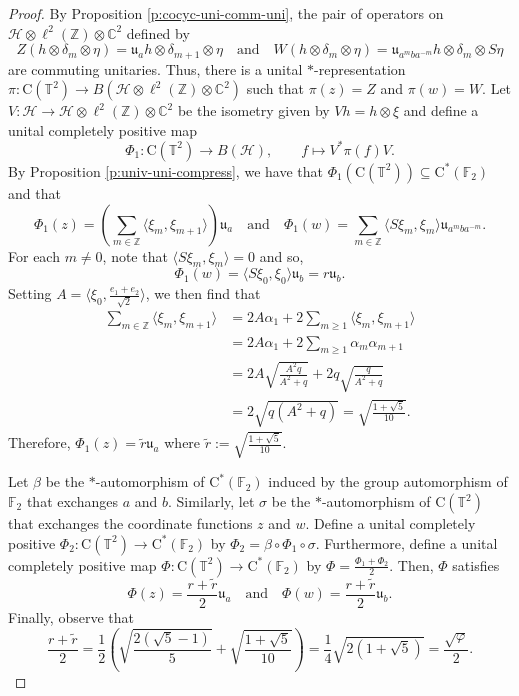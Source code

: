 \documentclass[10pt]{amsart}
\newcommand{\bC}{{\mathbb{C}}}
\newcommand{\bF}{{\mathbb{F}}}
\newcommand{\bT}{{\mathbb{T}}}
\newcommand{\bZ}{{\mathbb{Z}}}
\renewcommand{\H}{{\mathcal{H}}}
\newcommand{\rC}{\mathrm{C}}
\renewcommand{\phi}{\varphi}
\begin{document}
\begin{proof}
    By Proposition \ref{p:cocyc-uni-comm-uni}, the pair of operators on $\H\otimes\ell^2(\bZ)\otimes\bC^2$ defined by
    \[
        Z(h\otimes\delta_m\otimes\eta) = \mathfrak{u}_ah\otimes\delta_{m+1}\otimes\eta \quad \text{and} \quad W(h\otimes\delta_m\otimes\eta) = \mathfrak{u}_{a^mba^{-m}}h\otimes\delta_m\otimes S\eta
    \]
    are commuting unitaries. Thus, there is a unital $*$-representation $\pi:\rC(\bT^2)\rightarrow B(\H\otimes\ell^2(\bZ)\otimes\bC^2)$ such that $\pi(z) = Z$ and $\pi(w) = W$. Let $V:\H\rightarrow\H\otimes\ell^2(\bZ)\otimes\bC^2$ be the isometry given by $Vh = h\otimes\xi$ and define a unital completely positive map
    \[
        \Phi_1:\rC(\bT^2)\longrightarrow B(\H), \qquad f\longmapsto V^*\pi(f)V.
    \]
    By Proposition \ref{p:univ-uni-compress}, we have that $\Phi_1(\rC(\bT^2))\subseteq\rC^*(\bF_2)$ and that
    \[
        \Phi_1(z) = \left( \sum_{m\in\mathbb Z} \langle \xi_m,\xi_{m+1}\rangle\right)\mathfrak{u}_a \quad \text{and} \quad \Phi_1(w) = \sum_{m\in\mathbb Z}\langle S\xi_m,\xi_m\rangle\mathfrak{u}_{a^m b a^{-m}}.
    \]
    For each $m\neq 0$, note that $\langle S\xi_m,\xi_m\rangle = 0$ and so,
    \[
        \Phi_1(w)= \langle S\xi_0,\xi_0\rangle\mathfrak{u}_b =r\mathfrak{u}_b.
    \]
    Setting $A = \langle \xi_0,\frac{e_1+e_2}{\sqrt{2}}\rangle$, we then find that
    \begin{align*}
        \sum_{m\in\bZ}\langle\xi_m, \xi_{m+1}\rangle & =2A\alpha_1  +  2\sum_{m\geq 1}\langle \xi_m, \xi_{m+1}\rangle\\
        & = 2A\alpha_1 + 2 \sum_{m\geq 1}\alpha_m \alpha_{m+1}\\
        & = 2A\sqrt{\frac{A^2q}{A^2+q}} +2q \sqrt{\frac{q}{A^2+q}}\\
        & = 2\sqrt{q\left(A^2 + q \right)} = \sqrt{\frac{1+\sqrt{5}}{10}}.
    \end{align*}
    Therefore, $\Phi_1(z)=\widetilde{r} \mathfrak{u}_a$ where $\widetilde{r}:=\sqrt{\frac{1+\sqrt{5}}{10}}$.
    
    Let $\beta$ be the $*$-automorphism of $\rC^*(\bF_2)$ induced by the group automorphism of $\bF_2$ that exchanges $a$ and $b$. Similarly, let $\sigma$ be the $*$-automorphism of $\rC(\bT^2)$ that exchanges the coordinate functions $z$ and $w$. Define a unital completely positive $\Phi_2:\rC(\bT^2)\rightarrow\rC^*(\bF_2)$ by $\Phi_2 =\beta\circ \Phi_1\circ \sigma$. Furthermore, define a unital completely positive map $\Phi:\rC(\bT^2)\rightarrow\rC^*(\bF_2)$ by $\Phi=\frac{\Phi_1+\Phi_2}{2}$. Then, $\Phi$ satisfies
    \[
        \Phi(z)=\frac{r+\widetilde{r}}{2}\mathfrak{u}_a \quad \text{and} \quad \Phi(w)=\frac{r+\widetilde{r}}{2}\mathfrak{u}_b.
    \]
    Finally, observe that
    \[
        \frac{r+\widetilde{r}}{2} = \frac{1}{2}\left(\sqrt{\frac{2(\sqrt{5}-1)}{5}} + \sqrt{\frac{1+\sqrt{5}}{10}} \right) = \frac{1}{4}\sqrt{2(1+\sqrt{5})} = \frac{\sqrt{\phi}}{2}.
    \]
\end{proof}
\end{document}
